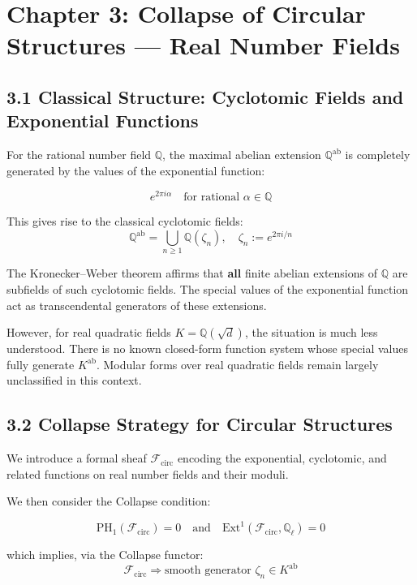 \documentclass[11pt]{article}
\begin{document}
\section{Chapter 3: Collapse of Circular Structures — Real Number Fields}

\subsection{3.1 Classical Structure: Cyclotomic Fields and Exponential Functions}

For the rational number field \( \mathbb{Q} \), the maximal abelian extension \( \mathbb{Q}^{\mathrm{ab}} \) is completely generated by the values of the exponential function:

\[
e^{2\pi i \alpha} \quad \text{for rational } \alpha \in \mathbb{Q}
\]

This gives rise to the classical cyclotomic fields:
\[
\mathbb{Q}^{\mathrm{ab}} = \bigcup_{n \geq 1} \mathbb{Q}(\zeta_n), \quad \zeta_n := e^{2\pi i/n}
\]

The Kronecker–Weber theorem affirms that \textbf{all} finite abelian extensions of \( \mathbb{Q} \) are subfields of such cyclotomic fields. The special values of the exponential function act as transcendental generators of these extensions.

However, for real quadratic fields \( K = \mathbb{Q}(\sqrt{d}) \), the situation is much less understood. There is no known closed-form function system whose special values fully generate \( K^{\mathrm{ab}} \). Modular forms over real quadratic fields remain largely unclassified in this context.

\subsection{3.2 Collapse Strategy for Circular Structures}

We introduce a formal sheaf \( \mathcal{F}_{\mathrm{circ}} \) encoding the exponential, cyclotomic, and related functions on real number fields and their moduli.

We then consider the Collapse condition:

\[
\boxed{
\mathrm{PH}_1(\mathcal{F}_{\mathrm{circ}}) = 0 \quad \text{and} \quad \mathrm{Ext}^1(\mathcal{F}_{\mathrm{circ}}, \mathbb{Q}_\ell) = 0
}
\]

which implies, via the Collapse functor:
\[
\mathcal{F}_{\mathrm{circ}} \Rightarrow \text{smooth generator } \zeta_n \in K^{\mathrm{ab}}
\]
\end{document}
